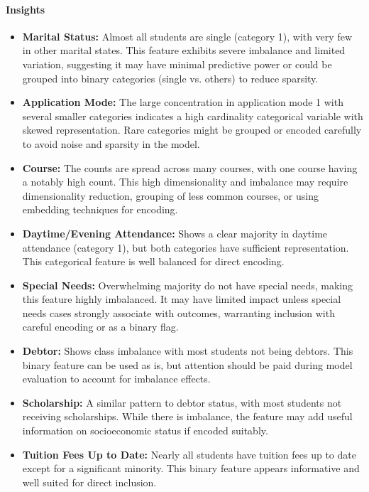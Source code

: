 \documentclass[twoside,final]{hcmut-report}
\begin{document}
\paragraph{Insights}
\begin{itemize}
  \item \textbf{Marital Status:} Almost all students are single (category 1), with very few in other marital states. This feature exhibits severe imbalance and limited variation, suggesting it may have minimal predictive power or could be grouped into binary categories (single vs. others) to reduce sparsity.
  \item \textbf{Application Mode:} The large concentration in application mode 1 with several smaller categories indicates a high cardinality categorical variable with skewed representation. Rare categories might be grouped or encoded carefully to avoid noise and sparsity in the model.
  \item \textbf{Course:} The counts are spread across many courses, with one course having a notably high count. This high dimensionality and imbalance may require dimensionality reduction, grouping of less common courses, or using embedding techniques for encoding.
  \item \textbf{Daytime/Evening Attendance:} Shows a clear majority in daytime attendance (category 1), but both categories have sufficient representation. This categorical feature is well balanced for direct encoding.
  \item \textbf{Special Needs:} Overwhelming majority do not have special needs, making this feature highly imbalanced. It may have limited impact unless special needs cases strongly associate with outcomes, warranting inclusion with careful encoding or as a binary flag.
  \item \textbf{Debtor:} Shows class imbalance with most students not being debtors. This binary feature can be used as is, but attention should be paid during model evaluation to account for imbalance effects.
  \item \textbf{Scholarship:} A similar pattern to debtor status, with most students not receiving scholarships. While there is imbalance, the feature may add useful information on socioeconomic status if encoded suitably.
  \item \textbf{Tuition Fees Up to Date:} Nearly all students have tuition fees up to date except for a significant minority. This binary feature appears informative and well suited for direct inclusion.
\end{itemize}
\end{document}
